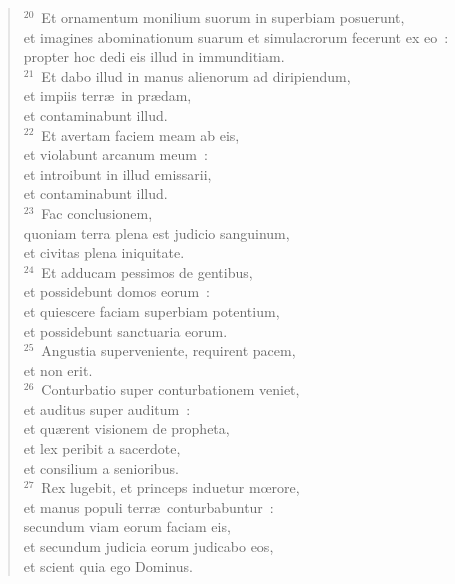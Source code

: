 \begin{flushleft}
\begin{verse}
${}^{20}$~Et ornamentum monilium suorum in superbiam posuerunt,\\ et imagines abominationum suarum et simulacrorum fecerunt ex eo~:\\ propter hoc dedi eis illud in immunditiam.\\
${}^{21}$~Et dabo illud in manus alienorum ad diripiendum,\\ et impiis terr\ae\ in pr\ae dam,\\ et contaminabunt illud.\\
${}^{22}$~Et avertam faciem meam ab eis,\\ et violabunt arcanum meum~:\\ et introibunt in illud emissarii,\\ et contaminabunt illud.\\
${}^{23}$~Fac conclusionem,\\ quoniam terra plena est judicio sanguinum,\\ et civitas plena iniquitate.\\
${}^{24}$~Et adducam pessimos de gentibus,\\ et possidebunt domos eorum~:\\ et quiescere faciam superbiam potentium,\\ et possidebunt sanctuaria eorum.\\
${}^{25}$~Angustia superveniente, requirent pacem,\\ et non erit.\\
${}^{26}$~Conturbatio super conturbationem veniet,\\ et auditus super auditum~:\\ et qu\ae rent visionem de propheta,\\ et lex peribit a sacerdote,\\ et consilium a senioribus.\\
${}^{27}$~Rex lugebit, et princeps induetur mœrore,\\ et manus populi terr\ae\ conturbabuntur~:\\ secundum viam eorum faciam eis,\\ et secundum judicia eorum judicabo eos,\\ et scient quia ego Dominus.\end{verse}\end{flushleft}


